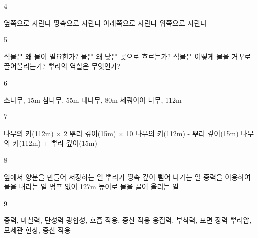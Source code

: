 \documentclass[fs9,seriesRus]{korfarm-base}
\begin{document}
\begin{kfSentenceUnit}{4}{}
\begin{kfChoices}
\kfChoice 옆쪽으로 자란다
\kfChoice 땅속으로 자란다
\kfChoice 아래쪽으로 자란다
\kfChoice 위쪽으로 자란다
\end{kfChoices}
\end{kfSentenceUnit}

\begin{kfSentenceUnit}{5}{}
\begin{kfChoices}
\kfChoice 식물은 왜 물이 필요한가?
\kfChoice 물은 왜 낮은 곳으로 흐르는가?
\kfChoice 식물은 어떻게 물을 거꾸로 끌어올리는가?
\kfChoice 뿌리의 역할은 무엇인가?
\end{kfChoices}
\end{kfSentenceUnit}

\begin{kfSentenceUnit}{6}{}
\begin{kfChoices}
\kfChoice 소나무, 15m
\kfChoice 참나무, 55m
\kfChoice 대나무, 80m
\kfChoice 세쿼이아 나무, 112m
\end{kfChoices}
\end{kfSentenceUnit}

\begin{kfSentenceUnit}{7}{}
\begin{kfChoices}
\kfChoice 나무의 키(112m) × 2
\kfChoice 뿌리 깊이(15m) × 10
\kfChoice 나무의 키(112m) - 뿌리 깊이(15m)
\kfChoice 나무의 키(112m) + 뿌리 깊이(15m)
\end{kfChoices}
\end{kfSentenceUnit}

\begin{kfSentenceUnit}{8}{}
\begin{kfChoices}
\kfChoice 잎에서 양분을 만들어 저장하는 일
\kfChoice 뿌리가 땅속 깊이 뻗어 나가는 일
\kfChoice 중력을 이용하여 물을 내리는 일
\kfChoice 펌프 없이 127m 높이로 물을 끌어 올리는 일
\end{kfChoices}
\end{kfSentenceUnit}

\begin{kfSentenceUnit}{9}{}
\begin{kfChoices}
\kfChoice 중력, 마찰력, 탄성력
\kfChoice 광합성, 호흡 작용, 증산 작용
\kfChoice 응집력, 부착력, 표면 장력
\kfChoice 뿌리압, 모세관 현상, 증산 작용
\end{kfChoices}
\end{kfSentenceUnit}
\end{document}
